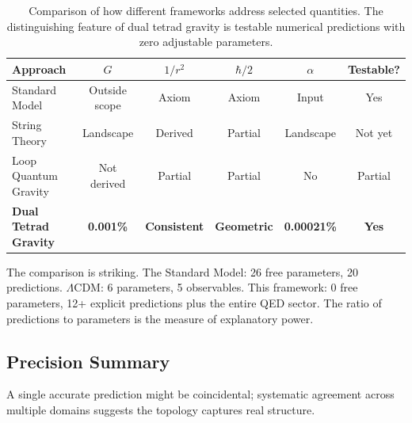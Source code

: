 \documentclass[aps,prd,preprint,superscriptaddress,showpacs,preprintnumbers,amsmath,amssymb,nofootinbib]{revtex4-2}
\begin{document}
\begin{table}[H]
\centering
\small
\begin{tabular*}{\textwidth}{@{\extracolsep{\fill}} lccccc @{}}
\toprule
\textbf{Approach} & \textbf{$G$} & \textbf{$1/r^2$} & \textbf{$\hbar/2$} & \textbf{$\alpha$} & \textbf{Testable?} \\
\midrule
Standard Model & Outside scope & Axiom & Axiom & Input & Yes \\
String Theory & Landscape & Derived & Partial & Landscape & Not yet \\
Loop Quantum Gravity & Not derived & Partial & Partial & No & Partial \\
\textbf{Dual Tetrad Gravity} & \textbf{0.001\%} & \textbf{Consistent} & \textbf{Geometric} & \textbf{0.00021\%} & \textbf{Yes} \\
\bottomrule
\end{tabular*}
\caption{Comparison of how different frameworks address selected quantities. The distinguishing feature of dual tetrad gravity is testable numerical predictions with zero adjustable parameters.}
\label{tab:comparison}
\end{table}

The comparison is striking. The Standard Model: 26 free parameters, 20 predictions. $\Lambda$CDM: 6 parameters, 5 observables. This framework: 0 free parameters, 12+ explicit predictions plus the entire QED sector. The ratio of predictions to parameters is the measure of explanatory power.

\subsection{Precision Summary}
\label{subsec:precision}

A single accurate prediction might be coincidental; systematic agreement across multiple domains suggests the topology captures real structure.
\end{document}
